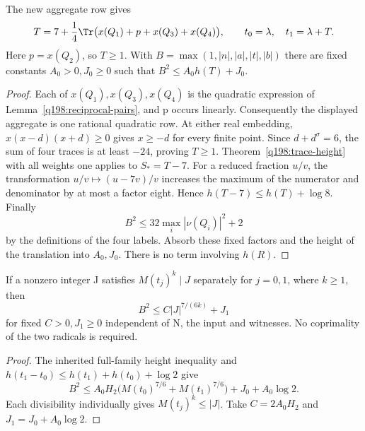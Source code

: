 \begin{corollary}\label{q198:shifted-aggregate}
The new aggregate row gives
\[
 T=7+\frac14\Tr\bigl(x(Q_1)+p+x(Q_3)+x(Q_4)\bigr),\qquad
 t_0=\lambda,\quad t_1=\lambda+T.
\]
Here $p=x(Q_2)$, so $T\ge1$. With
$B=\max(1,|n|,|a|,|t|,|b|)$ there are fixed constants
$A_0>0,J_0\ge0$ such that $B^2\le A_0h(T)+J_0$.
\end{corollary}
\begin{proof}
Each of $x(Q_1),x(Q_3),x(Q_4)$ is the quadratic expression of
Lemma~\ref{q198:reciprocal-pairs}, and p occurs linearly.
Consequently the displayed aggregate is one rational quadratic row.
At either real embedding, $x(x-d)(x+d)\ge0$ gives $x\ge-d$ for
every finite point. Since $d+d^\sigma=6$, the sum of four traces
is at least $-24$, proving $T\ge1$.
Theorem~\ref{q198:trace-height} with all weights one applies to
$S_*=T-7$. For a reduced fraction $u/v$, the transformation
$u/v\mapsto(u-7v)/v$ increases the maximum of the numerator and
denominator by at most a factor eight. Hence
$h(T-7)\le h(T)+\log8$. Finally
\[
 B^2\le32\max_i|\nu(Q_i)|^2+2
\]
by the definitions of the four labels. Absorb these fixed factors
and the height of the translation into $A_0,J_0$. There is no
term involving $h(R)$.
\end{proof}

\begin{lemma}\label{q198:additive-height}
If a nonzero integer J satisfies $M(t_j)^k\mid J$ separately
for $j=0,1$, where $k\ge1$, then
\[
                 B^2\le C|J|^{7/(6k)}+J_1
\]
for fixed $C>0,J_1\ge0$ independent of N, the input and witnesses.
No coprimality of the two radicals is required.
\end{lemma}
\begin{proof}
The inherited full-family height inequality and
$h(t_1-t_0)\le h(t_1)+h(t_0)+\log2$ give
\[
 B^2\le A_0H_2\bigl(M(t_0)^{7/6}+M(t_1)^{7/6}\bigr)
                   +J_0+A_0\log2.
\]
Each divisibility individually gives $M(t_j)^k\le|J|$.
Take $C=2A_0H_2$ and $J_1=J_0+A_0\log2$.
\end{proof}

